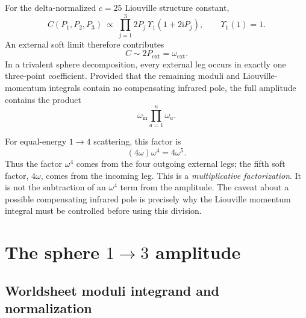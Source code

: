 \documentclass[11pt]{article}
\newcommand{\ii}{\mathrm{i}}
\begin{document}
For the delta-normalized $c=25$ Liouville structure constant,
\begin{equation}
  C(P_1,P_2,P_3)\ \propto\
  \prod_{j=1}^{3}2P_j\,\Upsilon_1(1+2\ii P_j),
  \qquad \Upsilon_1(1)=1.
  \label{eq:dozz-soft}
\end{equation}
An external soft limit therefore contributes
\begin{equation}
  C\sim 2P_{\mathrm{ext}}=\omega_{\mathrm{ext}}.
\end{equation}
In a trivalent sphere decomposition, every external leg occurs in exactly
one three-point coefficient.  Provided that the remaining moduli and
Liouville-momentum integrals contain no compensating infrared pole, the full
amplitude contains the product
\begin{equation}
  \omega_{\mathrm{in}}\prod_{a=1}^{n}\omega_a.
  \label{eq:external-soft-product}
\end{equation}

For equal-energy $1\to4$ scattering, this factor is
\begin{equation}
  (4\omega)\omega^4=4\omega^5.
\end{equation}
Thus the factor $\omega^4$ comes from the four outgoing external legs; the
fifth soft factor, $4\omega$, comes from the incoming leg.  This is a
\emph{multiplicative factorization}.  It is not the subtraction of an
$\omega^4$ term from the amplitude.  The caveat about a possible
compensating infrared pole is precisely why the Liouville momentum integral
must be controlled before using this division.

\section{The sphere \texorpdfstring{$1\to3$}{1 to 3} amplitude}
\label{sec:one-to-three}

\subsection{Worldsheet moduli integrand and normalization}
\end{document}

